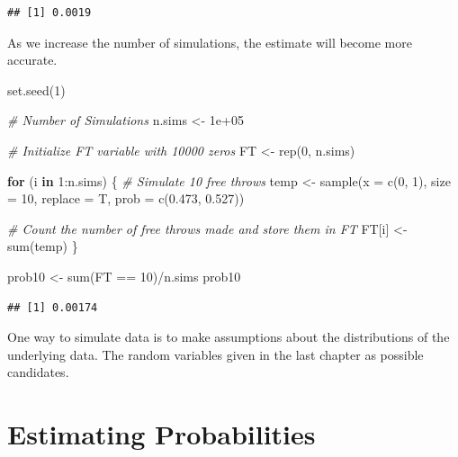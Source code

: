 \documentclass[
  11pt,
]{book}
\newenvironment{Shaded}{\begin{snugshade}}{\end{snugshade}}
\newcommand{\AttributeTok}[1]{\textcolor[rgb]{0.77,0.63,0.00}{#1}}
\newcommand{\CommentTok}[1]{\textcolor[rgb]{0.56,0.35,0.01}{\textit{#1}}}
\newcommand{\ControlFlowTok}[1]{\textcolor[rgb]{0.13,0.29,0.53}{\textbf{#1}}}
\newcommand{\DecValTok}[1]{\textcolor[rgb]{0.00,0.00,0.81}{#1}}
\newcommand{\FloatTok}[1]{\textcolor[rgb]{0.00,0.00,0.81}{#1}}
\newcommand{\FunctionTok}[1]{\textcolor[rgb]{0.00,0.00,0.00}{#1}}
\newcommand{\NormalTok}[1]{#1}
\newcommand{\OtherTok}[1]{\textcolor[rgb]{0.56,0.35,0.01}{#1}}
\newcommand{\SpecialCharTok}[1]{\textcolor[rgb]{0.00,0.00,0.00}{#1}}
\theoremstyle{definition}
\theoremstyle{definition}
\theoremstyle{definition}
\theoremstyle{definition}
\theoremstyle{remark}
\begin{document}
\begin{verbatim}
## [1] 0.0019
\end{verbatim}

As we increase the number of simulations, the estimate will become more accurate.

\begin{Shaded}
\begin{Highlighting}[]
\FunctionTok{set.seed}\NormalTok{(}\DecValTok{1}\NormalTok{)}

\CommentTok{\# Number of Simulations}
\NormalTok{n.sims }\OtherTok{\textless{}{-}} \FloatTok{1e+05}

\CommentTok{\# Initialize FT variable with 10000 zeros}
\NormalTok{FT }\OtherTok{\textless{}{-}} \FunctionTok{rep}\NormalTok{(}\DecValTok{0}\NormalTok{, n.sims)}

\ControlFlowTok{for}\NormalTok{ (i }\ControlFlowTok{in} \DecValTok{1}\SpecialCharTok{:}\NormalTok{n.sims) \{}
    \CommentTok{\# Simulate 10 free throws}
\NormalTok{    temp }\OtherTok{\textless{}{-}} \FunctionTok{sample}\NormalTok{(}\AttributeTok{x =} \FunctionTok{c}\NormalTok{(}\DecValTok{0}\NormalTok{, }\DecValTok{1}\NormalTok{), }\AttributeTok{size =} \DecValTok{10}\NormalTok{, }\AttributeTok{replace =}\NormalTok{ T, }\AttributeTok{prob =} \FunctionTok{c}\NormalTok{(}\FloatTok{0.473}\NormalTok{, }\FloatTok{0.527}\NormalTok{))}

    \CommentTok{\# Count the number of free throws made and store them in FT}
\NormalTok{    FT[i] }\OtherTok{\textless{}{-}} \FunctionTok{sum}\NormalTok{(temp)}
\NormalTok{\}}

\NormalTok{prob10 }\OtherTok{\textless{}{-}} \FunctionTok{sum}\NormalTok{(FT }\SpecialCharTok{==} \DecValTok{10}\NormalTok{)}\SpecialCharTok{/}\NormalTok{n.sims}
\NormalTok{prob10}
\end{Highlighting}
\end{Shaded}

\begin{verbatim}
## [1] 0.00174
\end{verbatim}

One way to simulate data is to make assumptions about the distributions of the underlying data. The random variables given in the last chapter as possible candidates.

\hypertarget{estimating-probabilities}{%
\section{Estimating Probabilities}\label{estimating-probabilities}}
\end{document}
